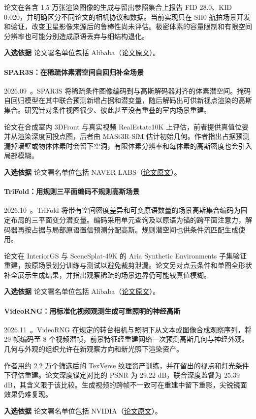 论文在各含 1.5 万张渲染图像的生成与留出参照集合上报告 FID 28.0、KID 0.020，并明确区分不同论文的相机协议和数据。当前实现只在 SH0 航拍场景开发和验证，改变卫星影像来源后的鲁棒性尚未评估。极密体素的容量限制和有限空间分辨率也可能分别造成原语丢弃与细结构退化。

\textbf{入选依据} 论文署名单位包括 Alibaba（\href{https://arxiv.org/abs/2608.17988}{论文原文}）。

\paragraph{SPAR3S：在稀疏体素潜空间自回归补全场景}
2026.09~\cite{2609_03931}。SPAR3S 将稀疏条件图像编码到与高斯解码器对齐的体素潜空间。掩码自回归模型在其中联合预测新增占据和潜变量，随后解码出可供新视点渲染的高斯集合。研究针对条件视图很少、彼此甚至没有重叠的室内场景重建。

论文在合成室内 3DFront 与真实视频 RealEstate10K 上评估，前者提供真值位姿并从渲染深度回投点图，后者由 MASt3R-SfM 估计初始几何。作者指出占据预测漏掉墙壁或物体体素时会留下空洞，有限体素分辨率和每体素的高斯密度也会引入局部模糊。

\textbf{入选依据} 论文署名单位包括 NAVER LABS（\href{https://arxiv.org/abs/2609.03931}{论文原文}）。

\paragraph{TriFold：用规则三平面编码不规则高斯场景}
2026.10~\cite{2610_23050}。TriFold 将带有空间密度差异和可变原语数量的场景高斯集合编码为固定布局的三平面变分潜变量。编码采用单元查询及以原语为锚的跨平面注意力，解码器再按占据与局部原语置信预测分配高斯。规则潜空间也供条件流匹配生成使用。

论文在 InteriorGS 与 SceneSplat-49K 的 Aria Synthetic Environments 子集验证重建，按原场景划分训练与测试以避免裁剪泄漏。论文另对点云条件和单图全形状补全展示生成结果，并指出观察稀疏的场景边界仍可能较真值模糊。

\textbf{入选依据} 论文署名单位包括 Alibaba（\href{https://arxiv.org/abs/2610.23050}{论文原文}）。

\paragraph{VideoRNG：用标准化视频观测生成可重照明的神经高斯}
2026.11~\cite{2611_25338}。VideoRNG 在规定的转台相机与照明下从文本或图像合成观察序列，将 29 帧编码至 8 个视频潜帧，前景特征经重建网络一次预测高斯几何与神经外观。几何与外观的组织允许在新观察方向和新光照下渲染资产。

作者用约 2.2 万个筛选后的 TexVerse 纹理资产训练，并在留出的视点和灯光条件下评估重建。论文深度锚定对比的 PSNR 为 29.22 dB，联合深度监督为 25.39 dB，其含义限于该比较。生成视频的跨帧不一致可在重建中留下重影，尖锐镜面效果仍难复现。

\textbf{入选依据} 论文署名单位包括 NVIDIA（\href{https://arxiv.org/abs/2611.25338}{论文原文}）。

